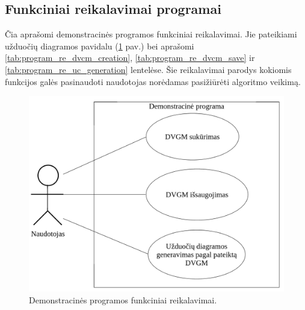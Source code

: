 \subsection{Funkciniai reikalavimai programai}

Čia aprašomi demonstracinės programos funkciniai reikalavimai. Jie pateikiami užduočių diagramos pavidalu (\ref{img:program_functional_requirements} pav.) bei aprašomi \ref{tab:program_re_dvcm_creation}, \ref{tab:program_re_dvcm_save} ir \ref{tab:program_re_uc_generation} lentelėse. Šie reikalavimai parodys kokiomis funkcijos galės pasinaudoti naudotojas norėdamas pasižiūrėti algoritmo veikimą.

\begin{figure}[H]
	\centering
	\includegraphics[width=\textwidth]{sections/prototype_app/img/program_functional_requirements}
	\caption{Demonstracinės programos funkciniai reikalavimai.}
	\label{img:program_functional_requirements}
\end{figure}

